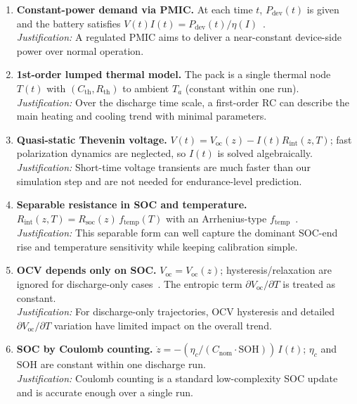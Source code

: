 \documentclass{mcmthesis}
\begin{document}
\begin{enumerate}[label=\textbf{A\arabic*.}, leftmargin=2em, itemsep=0.35em]

\item \textbf{Constant-power demand via PMIC.}
At each time $t$, $P_{\mathrm{dev}}(t)$ is given and the battery satisfies
$V(t)I(t)=P_{\mathrm{dev}}(t)/\eta(I)$~\cite{ref22,ref27}.\\
\textit{Justification:} A regulated PMIC aims to deliver a near-constant device-side power over normal operation.

\item \textbf{1st-order lumped thermal model.}
The pack is a single thermal node $T(t)$ with $(C_{\mathrm{th}},R_{\mathrm{th}})$ to ambient $T_a$ (constant within one run).\\
\textit{Justification:} Over the discharge time scale, a first-order RC can describe the main heating and cooling trend with minimal parameters.

\item \textbf{Quasi-static Thevenin voltage.}
$V(t)=V_{\mathrm{oc}}(z)-I(t)R_{\mathrm{int}}(z,T)$; fast polarization dynamics are neglected, so $I(t)$ is solved algebraically.\\
\textit{Justification:} Short-time voltage transients are much faster than our simulation step and are not needed for endurance-level prediction.

\item \textbf{Separable resistance in SOC and temperature.}
$R_{\mathrm{int}}(z,T)=R_{\mathrm{soc}}(z)\,f_{\mathrm{temp}}(T)$ with an Arrhenius-type $f_{\mathrm{temp}}$~\cite{ref24,ref25}.\\
\textit{Justification:} This separable form can well capture the dominant SOC-end rise and temperature sensitivity while keeping calibration simple.

\item \textbf{OCV depends only on SOC.}
$V_{\mathrm{oc}}=V_{\mathrm{oc}}(z)$; hysteresis/relaxation are ignored for discharge-only cases~\cite{ref23}.
The entropic term $\partial V_{\mathrm{oc}}/\partial T$ is treated as constant.\\
\textit{Justification:} For discharge-only trajectories, OCV hysteresis and detailed $\partial V_{\mathrm{oc}}/\partial T$ variation have limited impact on the overall trend.

\item \textbf{SOC by Coulomb counting.}
$\dot z=-(\eta_c/(C_{\mathrm{nom}}\cdot\mathrm{SOH}))\,I(t)$; $\eta_c$ and $\mathrm{SOH}$ are constant within one discharge run.\\
\textit{Justification:} Coulomb counting is a standard low-complexity SOC update and is accurate enough over a single run.


\end{enumerate}
\end{document}
